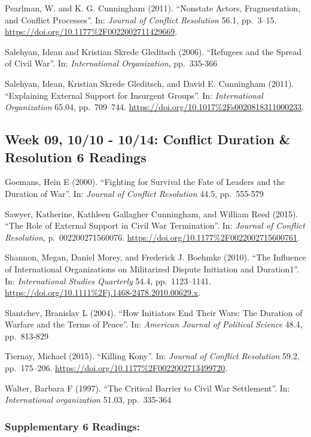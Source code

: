 \documentclass[10pt,]{article}
\begin{document}
Pearlman, W. and K. G. Cunningham (2011). ``Nonstate Actors,
Fragmentation, and Conflict Processes''. In:
\emph{Journal of Conflict Resolution} 56.1, pp.~3--15.
\url{https://doi.org/10.1177\%2F0022002711429669}.

Salehyan, Idean and Kristian Skrede Gleditsch (2006). ``Refugees and the
Spread of Civil War''. In: \emph{International Organization},
pp.~335-366

Salehyan, Idean, Kristian Skrede Gleditsch, and David E. Cunningham
(2011). ``Explaining External Support for Insurgent Groups''. In:
\emph{International Organization} 65.04, pp.~709--744.
\url{https://doi.org/10.1017\%2Fs0020818311000233}.

\subsection{Week 09, 10/10 - 10/14: Conflict Duration \& Resolution
\textbar{} 6
Readings}\label{week-09-1010---1014-conflict-duration-resolution-6-readings}

Goemans, Hein E (2000). ``Fighting for Survival the Fate of Leaders and
the Duration of War''. In: \emph{Journal of Conflict Resolution} 44.5,
pp.~555-579

Sawyer, Katherine, Kathleen Gallagher Cunningham, and William Reed
(2015). ``The Role of External Support in Civil War Termination''. In:
\emph{Journal of Conflict Resolution}, p.~002200271560076.
\url{https://doi.org/10.1177\%2F0022002715600761}.

Shannon, Megan, Daniel Morey, and Frederick J. Boehmke (2010). ``The
Influence of International Organizations on Militarized Dispute
Initiation and Duration1''. In: \emph{International Studies Quarterly}
54.4, pp.~1123--1141.
\url{https://doi.org/10.1111\%2Fj.1468-2478.2010.00629.x}.

Slantchev, Branislav L (2004). ``How Initiators End Their Wars: The
Duration of Warfare and the Terms of Peace''. In:
\emph{American Journal of Political Science} 48.4, pp.~813-829

Tiernay, Michael (2015). ``Killing Kony''. In:
\emph{Journal of Conflict Resolution} 59.2, pp.~175--206.
\url{https://doi.org/10.1177\%2F0022002713499720}.

Walter, Barbara F (1997). ``The Critical Barrier to Civil War
Settlement''. In: \emph{International organization} 51.03, pp.~335-364

\subsubsection{Supplementary \textbar{} 6
Readings:}\label{supplementary-6-readings-2}
\end{document}
